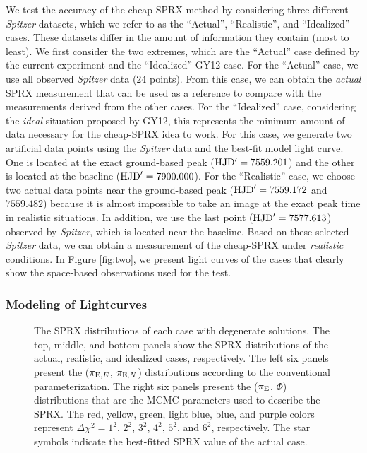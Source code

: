 \documentclass[10pt]{emulateapj}
\begin{document}
 We test the accuracy of the cheap-SPRX method by considering three different {\it Spitzer} 
datasets, which we refer to as the ``Actual'', ``Realistic'', and ``Idealized'' cases. These datasets differ 
in the amount of information they contain (most to least). We first consider the two extremes, 
which are the ``Actual'' case defined by the current experiment and the ``Idealized'' GY12 case. 
For the ``Actual'' case, we use all observed {\it Spitzer} data ($24$ points). From this case, 
we can obtain the {\it actual} SPRX measurement that can be used as a reference to compare with 
the measurements derived from the other cases. For the ``Idealized'' case, considering the 
{\it ideal} situation proposed by GY12, this represents the minimum amount of data necessary 
for the cheap-SPRX idea to work. For this case, we generate two artificial data points using 
the {\it Spitzer} data and the best-fit model light curve. One is located at the exact 
ground-based peak (${\rm HJD'}=7559.201$) and the other is located at the baseline 
(${\rm HJD}'=7900.000$). For the ``Realistic'' case, we choose two actual data points near 
the ground-based peak (${\rm HJD}'=7559.172$ and $7559.482$) because it is almost impossible 
to take an image at the exact peak time in realistic situations. In addition, we use the last 
point (${\rm HJD}'=7577.613$) observed by {\it Spitzer}, which is located near the baseline. 
Based on these selected {\it Spitzer} data, we can obtain a measurement of the cheap-SPRX 
under {\it realistic} conditions. In Figure \ref{fig:two}, we present light curves of 
the cases that clearly show the space-based observations used for the test.

\subsubsection{Modeling of Lightcurves}

\begin{figure*}[htb!]
\caption{
The SPRX distributions of each case with degenerate solutions. The top, middle, and bottom panels 
show the SPRX distributions of the actual, realistic, and idealized cases, respectively. The left 
six panels present the ($\pi_{{\rm E},E}$, $\pi_{{\rm E},N}$) distributions according to the 
conventional parameterization. The right six panels present the ($\pi_{\rm E}$, $\Phi$) 
distributions that are the MCMC parameters used to describe the SPRX. The red, yellow, green, 
light blue, blue, and purple colors represent $\Delta\chi^2=1^2$, $2^2$, $3^2$, $4^2$, $5^2$, 
and $6^2$, respectively. The star symbols indicate the best-fitted SPRX value of the actual case.
\label{fig:three}}
\end{figure*}
\end{document}
